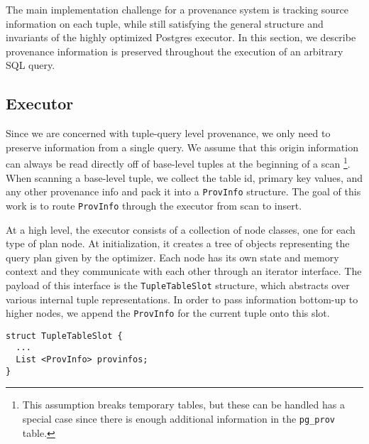 
The main implementation challenge for a provenance system is tracking source information on each tuple, while still satisfying the general structure and invariants of the highly optimized Postgres executor. In this section, we describe provenance information is preserved throughout the execution of an arbitrary SQL query.

\subsection{Executor}

Since we are concerned with tuple-query level provenance, we only need to preserve information from a single query. We assume that this origin information can always be read directly off of base-level tuples at the beginning of a scan \footnote{This assumption breaks temporary tables, but these can be handled has a special case since there is enough additional information in the \texttt{pg\_prov} table. }. When scanning a base-level tuple, we collect the table id, primary key values, and any other provenance info and pack it into a \texttt{ProvInfo} structure. The goal of this work is to route \texttt{ProvInfo} through the executor from scan to insert.

At a high level, the executor consists of a collection of node classes, one for each type of plan node. At initialization, it creates a tree of objects representing the query plan given by the optimizer. Each node has its own state and memory context and they communicate with each other through an iterator interface. The payload of this interface is the \texttt{TupleTableSlot} structure, which abstracts over various internal tuple representations. In order to pass information bottom-up to higher nodes, we append the \texttt{ProvInfo} for the current tuple onto this slot.


\begin{verbatim}
struct TupleTableSlot {
  ...
  List <ProvInfo> provinfos;
}
\end{verbatim}

